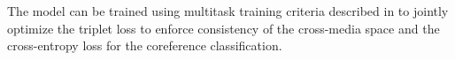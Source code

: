 \documentclass[11pt,a4paper]{article}
\newcommand{\bo}{\mathbf{o}}
\newcommand{\bw}{\mathbf{w}}
\begin{document}
The model can be trained using multitask training criteria described in \cite{Li2020-crossmedia-ie} to jointly optimize the triplet loss to enforce consistency of the cross-media space and the cross-entropy loss for the coreference classification.


%

\end{document}
